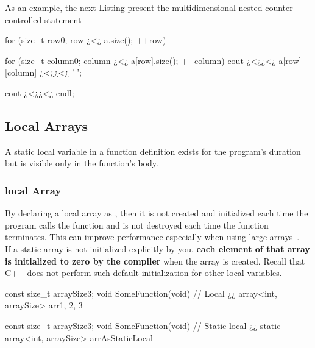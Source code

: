 As an example, the next Listing present the multidimensional nested counter-controlled statement\\
\begin{minipage}{\MPWxSMALLxLISTING\textwidth} %
{} %
\begin{CPPCode}
for (size_t row{0}; row ¿<¿ a.size(); ++row)
{
    for (size_t column{0}; column ¿<¿ a[row].size(); ++column) 
    {
        cout ¿<¿¿<¿ a[row][column] ¿<¿¿<¿ ' ';
    }
    
    cout ¿<¿¿<¿ endl;
}
\end{CPPCode}
\end{minipage}

\subsection{Local Arrays}
A static local variable in a function definition exists for the program’s duration but is visible only in the function’s body.
\subsubsection{ local Array}
By declaring a local array as , then it is not created and initialized each time the program calls the function and is not destroyed each time the function terminates. This can improve performance especially when using large arrays~\cite{deitel2017c++}.\\

\noindent If a static array is not initialized explicitly by you, \textbf{each element of that array is initialized to zero by the compiler} when the array is created. Recall that C++ does not perform such default initialization for other local variables.\\
\noindent
\begin{minipage}{\MPWxXSxLISTING\textwidth} %
{} %
        \begin{CPPCode}
const size_t arraySize{3};
void SomeFunction(void)
{
    // Local ¿¿
    array<int, arraySize> arr{1, 2, 3}
}
        \end{CPPCode}
    \end{minipage}
    \begin{minipage}{\MPWxSxLISTING\textwidth} %
        \begin{CPPCode}
const size_t arraySize{3};
void SomeFunction(void)
{
        // Static local ¿¿
    static array<int, arraySize> arrAsStaticLocal
}
        \end{CPPCode}
\end{minipage}

